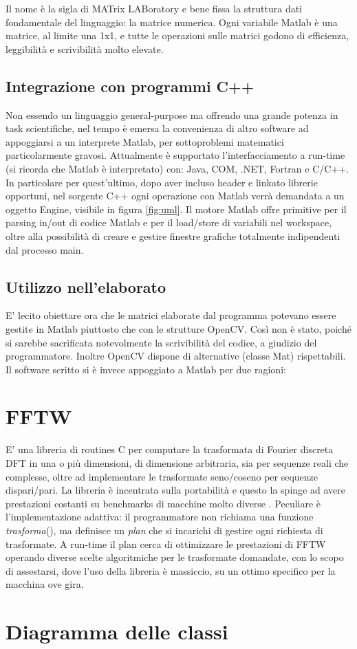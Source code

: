 Il nome è la sigla di MATrix LABoratory e bene fissa la struttura dati fondamentale del linguaggio: la matrice numerica. Ogni variabile Matlab è una matrice, al limite una 1x1, e tutte le operazioni sulle matrici godono di efficienza, leggibilità e scrivibilità molto elevate.
	\subsection{Integrazione con programmi C++}
Non essendo un linguaggio general-purpose ma offrendo una grande potenza in task scientifiche, nel tempo è emersa la convenienza di altro software ad appoggiarsi a un interprete Matlab, per sottoproblemi matematici particolarmente gravosi. Attualmente è supportato l'interfacciamento a run-time (si ricorda che Matlab è interpretato) con: Java, COM, .NET, Fortran e C/C++. In particolare per quest'ultimo, dopo aver incluso header e linkato librerie opportuni, nel sorgente C++ ogni operazione con Matlab verrà demandata a un oggetto Engine, visibile in figura \ref{fig:uml}.
Il motore Matlab offre primitive per il parsing in/out di codice Matlab e per il load/store di variabili nel workspace, oltre alla possibilità di creare e gestire finestre grafiche totalmente indipendenti dal processo main.
	\subsection{Utilizzo nell'elaborato}
E' lecito obiettare ora che le matrici elaborate dal programma potevano essere gestite in Matlab piuttosto che con le strutture OpenCV. Così non è stato, poiché si sarebbe sacrificata notevolmente la scrivibilità del codice, a giudizio del programmatore. Inoltre OpenCV dispone di alternative (classe Mat) rispettabili.
Il software scritto si è invece appoggiato a Matlab per due ragioni: 
\section{FFTW}
E' una libreria di routines C per computare la trasformata di Fourier discreta DFT in una o più dimensioni, di dimensione arbitraria, sia per sequenze reali che complesse, oltre ad implementare le trasformate seno/coseno per sequenze dispari/pari.
La libreria è incentrata sulla portabilità e questo la spinge ad avere prestazioni costanti su benchmarks di macchine molto diverse \cite{FFTW}.
Peculiare è l'implementazione adattiva: il programmatore non richiama una funzione {\em trasforma}(), ma definisce un {\em plan} che si incarichi di gestire ogni richiesta di trasformate. A run-time il plan cerca di ottimizzare le prestazioni di FFTW operando diverse scelte algoritmiche per le trasformate domandate, con lo scopo di assestarsi, dove l'uso della libreria è massiccio, su un ottimo specifico per la macchina ove gira.
\section{Diagramma delle classi}
